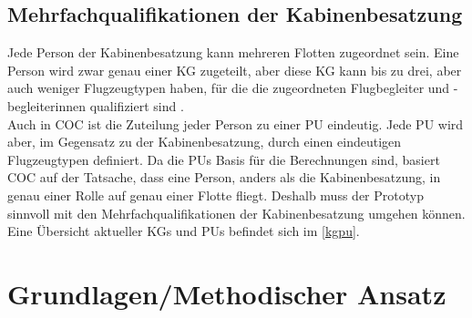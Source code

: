 \documentclass [12pt, a4paper, oneside, titlepage, ngerman]{article}
\begin{document}
\subsection{Mehrfachqualifikationen der Kabinenbesatzung}
Jede Person der Kabinenbesatzung kann mehreren Flotten zugeordnet sein. Eine Person wird zwar genau einer \ac{KG} zugeteilt, aber diese \ac{KG} kann bis zu drei, aber auch weniger Flugzeugtypen haben, für die die zugeordneten Flugbegleiter und -begleiterinnen qualifiziert sind \cite[vgl.][]{Gespraech2}. \\
Auch in \ac {COC} ist die Zuteilung jeder Person zu einer \ac{PU} eindeutig. Jede \ac{PU} wird aber, im Gegensatz zu der Kabinenbesatzung, durch einen eindeutigen Flugzeugtypen definiert. Da die \acp{PU} Basis für die Berechnungen sind, basiert \ac{COC} auf der Tatsache, dass eine Person, anders als die Kabinenbesatzung, in genau einer Rolle auf genau einer Flotte fliegt. Deshalb muss der Prototyp sinnvoll mit den Mehrfachqualifikationen der Kabinenbesatzung umgehen können. \\
Eine Übersicht aktueller \acp{KG} und \acp{PU} befindet sich im \autoref{kgpu}.

\newpage

\section {Grundlagen/Methodischer Ansatz}
\end{document}
